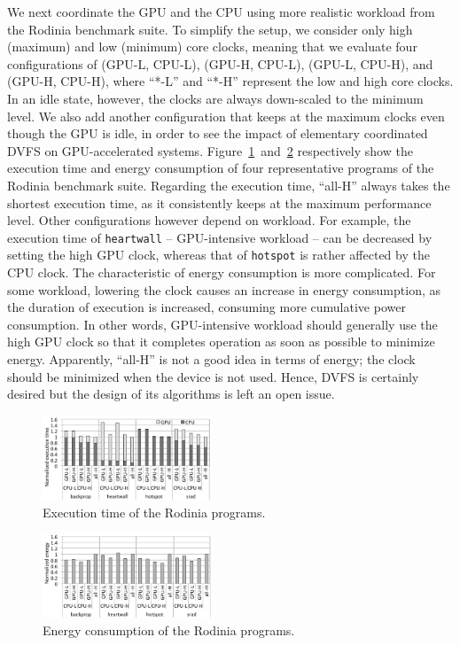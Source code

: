 We next coordinate the GPU and the CPU using more realistic workload
from the Rodinia benchmark suite.
To simplify the setup, we consider only high (maximum) and low
(minimum) core clocks, meaning that we evaluate four configurations of
(GPU-L, CPU-L), (GPU-H, CPU-L), (GPU-L, CPU-H), and (GPU-H, CPU-H),
where ``*-L'' and ``*-H'' represent the low and high core clocks. 
In an idle state, however, the clocks are always down-scaled to the
minimum level.
We also add another configuration that keeps at the maximum clocks even
though the GPU is idle, in order to see the impact of elementary
coordinated DVFS on GPU-accelerated systems.
Figure~\ref{fig:rodinia-time}~and~\ref{fig:rodinia-energy} respectively
show the execution time and energy consumption of four representative
programs of the Rodinia benchmark suite.
Regarding the execution time, ``all-H'' always takes the shortest
execution time, as it consistently keeps at the maximum performance level.
Other configurations however depend on workload.
For example, the execution time of \texttt{heartwall} -- GPU-intensive
workload -- can be decreased by setting the high GPU clock, whereas that
of \texttt{hotspot} is rather affected by the CPU clock.
The characteristic of energy consumption is more complicated.
For some workload, lowering the clock causes an increase in energy
consumption, as the duration of execution is increased, consuming more
cumulative power consumption.
In other words, GPU-intensive workload should generally use the high GPU
clock so that it completes operation as soon as possible to minimize
energy.
Apparently, ``all-H'' is not a good idea in terms of energy; the clock
should be minimized when the device is not used.
Hence, DVFS is certainly desired but the design of its algorithms is
left an open issue.

\begin{figure}[!t]
\centering
 \includegraphics[width=0.45\textwidth]{figures/rodinia-time.pdf}
 \caption{Execution time of the Rodinia programs.}
 \label{fig:rodinia-time}
\end{figure}

\begin{figure}[!t]
\centering
 \includegraphics[width=0.45\textwidth]{figures/rodinia-energy.pdf}
 \caption{Energy consumption of the Rodinia programs.}
 \label{fig:rodinia-energy}
\end{figure}

